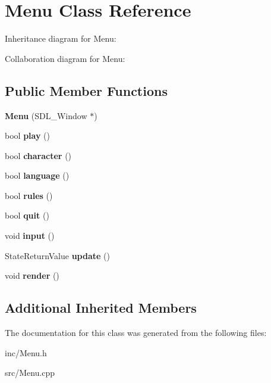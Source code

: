 \hypertarget{class_menu}{}\section{Menu Class Reference}
\label{class_menu}


Inheritance diagram for Menu\+:


Collaboration diagram for Menu\+:
\subsection*{Public Member Functions}
\begin{DoxyCompactItemize}
\item 
\mbox{\label{class_menu_a1d402c856fa7fc807244f52d40b0effe}} 
{\bfseries Menu} (S\+D\+L\+\_\+\+Window $\ast$)
\item 
\mbox{\label{class_menu_a83667679f61a0ddc798ac11e12174197}} 
bool {\bfseries play} ()
\item 
\mbox{\label{class_menu_a79e20a838bb077bdd360faf38a8fd055}} 
bool {\bfseries character} ()
\item 
\mbox{\label{class_menu_a68bc6232ba256e871ff0378fb444831f}} 
bool {\bfseries language} ()
\item 
\mbox{\label{class_menu_a1e0ffcbd43615e002024b5da07ad65bb}} 
bool {\bfseries rules} ()
\item 
\mbox{\label{class_menu_ab1074d164e0fd89ab18bb97cea8c2e4b}} 
bool {\bfseries quit} ()
\item 
\mbox{\label{class_menu_a466dbf25f487faea098fb1570a8bf507}} 
void {\bfseries input} ()
\item 
\mbox{\label{class_menu_ac4b26904ff60266814dfd452e8378055}} 
State\+Return\+Value {\bfseries update} ()
\item 
\mbox{\label{class_menu_ab714de8d7efd0a2bdf8b04fa0809eb4b}} 
void {\bfseries render} ()
\end{DoxyCompactItemize}
\subsection*{Additional Inherited Members}


The documentation for this class was generated from the following files\+:\begin{DoxyCompactItemize}
\item 
inc/Menu.\+h\item 
src/Menu.\+cpp\end{DoxyCompactItemize}
